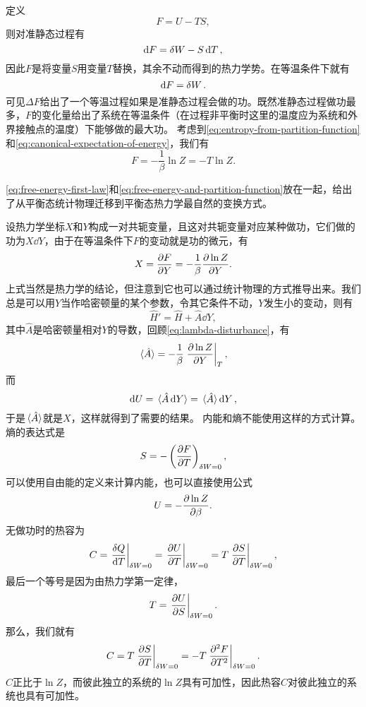 \documentclass[hyperref, UTF8, a4paper]{ctexart}
\begin{document}
定义
\begin{equation}
    F = U - TS, 
\end{equation}
则对准静态过程有
\begin{equation}
    \dd{F} = \var{W} - S \dd{T},
    \label{eq:free-energy-first-law}
\end{equation}
因此$F$是将变量$S$用变量$T$替换，其余不动而得到的热力学势。在等温条件下就有
\[
    \dd{F} = \var{W}.
\]
可见$\Delta F$给出了一个等温过程如果是准静态过程会做的功。既然准静态过程做功最多，$F$的变化量给出了系统在等温条件（在过程非平衡时这里的温度应为系统和外界接触点的温度）下能够做的最大功。
考虑到\eqref{eq:entropy-from-partition-function}和\eqref{eq:canonical-expectation-of-energy}，我们有
\begin{equation}
    F = - \frac{1}{\beta} \ln Z = - T \ln Z.
    \label{eq:free-energy-and-partition-function}
\end{equation}

\eqref{eq:free-energy-first-law}和\eqref{eq:free-energy-and-partition-function}放在一起，给出了从平衡态统计物理迁移到平衡态热力学最自然的变换方式。

设热力学坐标$X$和$Y$构成一对共轭变量，且这对共轭变量对应某种做功，它们做的功为$X \dd{Y}$，由于在等温条件下$F$的变动就是功的微元，有
\begin{equation}
    X = \pdv{F}{Y} = -\frac{1}{\beta} \pdv{\ln Z}{Y}.
\end{equation}
上式当然是热力学的结论，但注意到它也可以通过统计物理的方式推导出来。我们总是可以用$Y$当作哈密顿量的某个参数，令其它条件不动，$Y$发生小的变动，则有
\[
    \hat{H}' = \hat{H} + \hat{A} \dd{Y},
\]
其中$\hat{A}$是哈密顿量相对$Y$的导数，回顾\eqref{eq:lambda-disturbance}，有
\[
    \expval*{\hat{A}} = - \frac{1}{\beta} \eval{\pdv{\ln Z}{Y}}_{T},
\]
而
\[
    \dd{U} = \expval*{\hat{A} \dd{Y}} = \expval*{\hat{A}} \dd{Y},
\]
于是$\expval*{\hat{A}}$就是$X$，这样就得到了需要的结果。
内能和熵不能使用这样的方式计算。熵的表达式是
\begin{equation}
    S = - \left( \pdv{F}{T} \right)_{\var{W}=0},
\end{equation}
可以使用自由能的定义来计算内能，也可以直接使用公式
\begin{equation}
    U = - \pdv{\ln Z}{\beta}.
\end{equation}
无做功时的热容为
\[
    C = \eval{\frac{\var{Q}}{\dd{T}}}_{\var{W}=0} = \eval{\pdv{U}{T}}_{\var{W}=0} = T \eval{\pdv{S}{T}}_{\var{W}=0},
\]
最后一个等号是因为由热力学第一定律，
\[
    T = \eval{\pdv{U}{S}}_{\var{W}=0}.
\]
那么，我们就有
\begin{equation}
    C = T \eval{\pdv{S}{T}}_{\var{W}=0} = - T \eval{\pdv[2]{F}{T}}_{\var{W}=0}.
\end{equation}
$C$正比于$\ln Z$，而彼此独立的系统的$\ln Z$具有可加性，因此热容$C$对彼此独立的系统也具有可加性。
\end{document}
